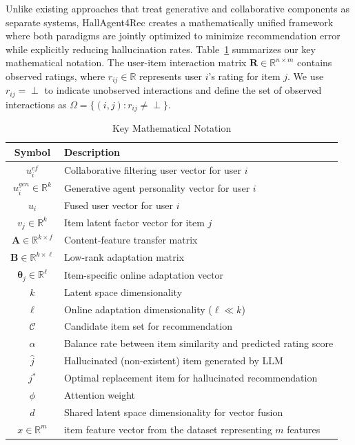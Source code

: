 \documentclass[acmsmall]{acmart}
\begin{document}
Unlike existing approaches that treat generative and collaborative components as separate systems, HallAgent4Rec creates a mathematically unified framework where both paradigms are jointly optimized to minimize recommendation error while explicitly reducing hallucination rates.
Table~\ref{tab:notation} summarizes our key mathematical notation. 
The user-item interaction matrix $\mathbf{R} \in \mathbb{R}^{n \times m}$ contains observed ratings, where $r_{ij} \in \mathbb{R}$ represents user $i$'s rating for item $j$. We use $r_{ij} = \perp$ to indicate unobserved interactions and define the set of observed interactions as $\Omega = \{(i,j) : r_{ij} \neq \perp\}$.

\begin{table}[h]
\centering
\caption{Key Mathematical Notation}
\label{tab:notation}
\begin{tabular}{cl}
\hline
\textbf{Symbol} & \textbf{Description} \\
\hline
$u^{cf}_i$ & Collaborative filtering user vector for user $i$ \\
$u^{gen}_i \in \mathbb{R}^k$ & Generative agent personality vector for user $i$ \\
$u_i$ & Fused user vector for user $i$ \\
$v_j \in \mathbb{R}^k$ & Item latent factor vector for item $j$ \\
$\mathbf{A} \in \mathbb{R}^{k \times f}$ & Content-feature transfer matrix \\
$\mathbf{B} \in \mathbb{R}^{k \times \ell}$ & Low-rank adaptation matrix \\
$\boldsymbol{\theta}_j \in \mathbb{R}^\ell$ & Item-specific online adaptation vector \\
$k$ & Latent space dimensionality \\
$\ell$ & Online adaptation dimensionality ($\ell \ll k$) \\
$\mathcal{C}$ & Candidate item set for recommendation \\
$\alpha$ & Balance rate between item similarity and predicted rating score \\ 
$\hat{j}$ & Hallucinated (non-existent) item generated by LLM \\
$j^*$ & Optimal replacement item for hallucinated recommendation \\
$\phi$ & Attention weight \\
$d$ & Shared latent space dimensionality for vector fusion \\
$x \in \mathbb{R}^m$ & item feature vector from the dataset representing $m$ features\\
\hline
\end{tabular}
\end{table}
\end{document}
